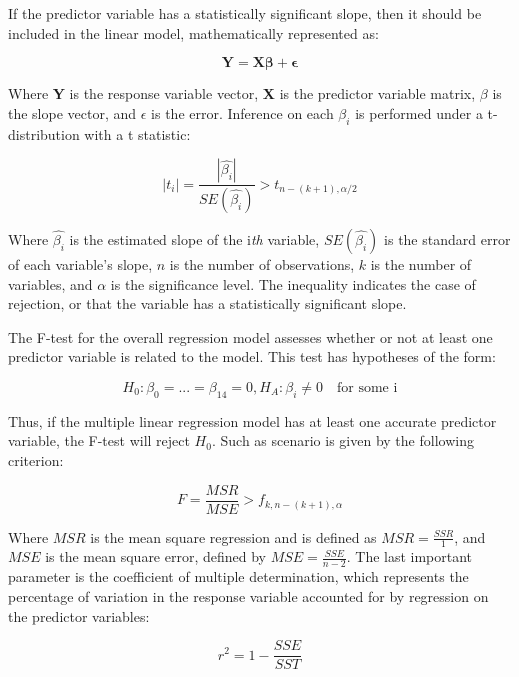 \documentclass[12pt]{article}
\begin{document}
If the predictor variable has a statistically significant slope, then it should be included in the linear model, mathematically represented as:

\begin{equation}
    \boldsymbol{Y} = \boldsymbol{X\beta} + \boldsymbol{\epsilon}
\end{equation}

Where \textbf{Y} is the response variable vector, \textbf{X} is the predictor variable matrix, $\beta$ is the slope vector, and $\epsilon$ is the error. Inference on each $\beta_i$ is performed under a t-distribution with a t statistic:

\begin{equation}
    |t_i| = \frac{|\hat{\beta_i}|}{SE(\hat{\beta_i})} > t_{n - (k+1) , \alpha/2}
\end{equation}

Where $\hat{\beta_i}$ is the estimated slope of the i\textit{th} variable, $SE(\hat{\beta_i})$ is the standard error of each variable's slope, $n$ is the number of observations, $k$ is the number of variables, and $\alpha$ is the significance level. The inequality indicates the case of rejection, or that the variable has a statistically significant slope.

The F-test for the overall regression model assesses whether or not at least one predictor variable is related to the model. This test has hypotheses of the form:

\begin{equation}
    H_0: \beta_0 = ... = \beta_{14} = 0 , H_A: \beta_i \neq 0 \quad \textrm{for some i}
\end{equation}

Thus, if the multiple linear regression model has at least one accurate predictor variable, the F-test will reject $H_0$. Such as scenario is given by the following criterion:

\begin{equation}
    F = \frac{MSR}{MSE} > f_{k, n - (k+1), \alpha}
\end{equation}

Where $MSR$ is the mean square regression and is defined as $MSR = \frac{SSR}{1}$, and $MSE$ is the mean square error, defined by $MSE = \frac{SSE}{n-2}$. The last important parameter is the coefficient of multiple determination, which represents the percentage of variation in the response variable accounted for by regression on the predictor variables:

\begin{equation}
    r^2 = 1 - \frac{SSE}{SST}
\end{equation}
 
\end{document}
